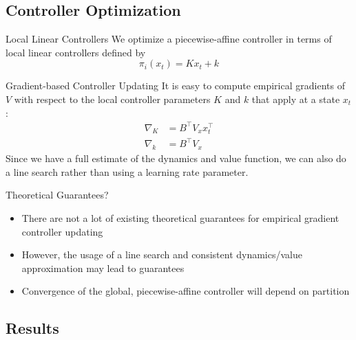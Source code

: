 \documentclass{beamer}
\begin{document}
\subsection{Controller Optimization}

\begin{frame}{Local Linear Controllers}
  We optimize a piecewise-affine controller in terms of local linear controllers defined by
  \begin{equation}
    \pi_i(x_t) = Kx_t + k
  \end{equation}
\end{frame}

\begin{frame}{Gradient-based Controller Updating}
  It is easy to compute empirical gradients of $V$ with respect to the local
  controller parameters $K$ and $k$ that apply at a state $x_t$:
  \begin{align}
    \nabla_K &= B^\top V_x x_t^\top \\
    \nabla_k &= B^\top V_x
  \end{align}
  Since we have a full estimate of the dynamics and value function, we can also
  do a line search rather than using a learning rate parameter. 
\end{frame}

\begin{frame}{Theoretical Guarantees?}
  \begin{itemize}
    \item There are not a lot of existing theoretical guarantees for empirical gradient controller updating
    \item However, the usage of a line search and consistent dynamics/value approximation may lead to guarantees
    \item Convergence of the global, piecewise-affine controller will depend on partition
  \end{itemize}
\end{frame}

\subsection{Results}
\end{document}
